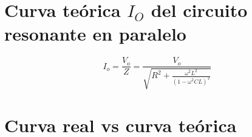 \documentclass[conference]{IEEEtran}
\begin{document}
	\section{Curva teórica $I_O$ del circuito resonante en paralelo}
	\begin{equation}
		I_o = \frac{V_o}{Z} = \frac{V_o}{\sqrt{R^2 + \frac{\omega^2 L^2}{(1 - \omega^2 CL)^2}}}
		\label{eq:corriente-paralelo}
	\end{equation}

	
	\section{Curva real vs curva teórica}
	
	
	
	
\end{document}
